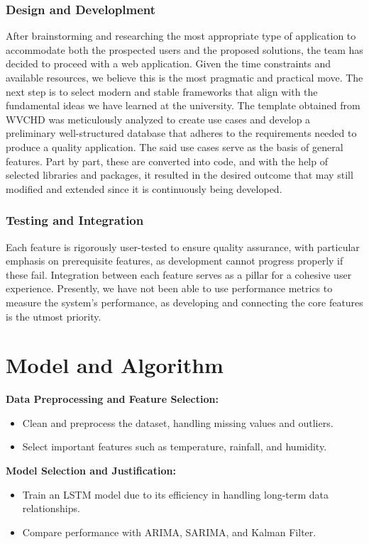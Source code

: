 \subsubsection{Design and Developlment}
After brainstorming and researching the most appropriate type of application to accommodate both the prospected users and the proposed solutions, the team has decided to proceed with a web application. Given the time constraints and available resources, we believe this is the most pragmatic and practical move. The next step is to select modern and stable frameworks that align with the fundamental ideas we have learned at the university. The template obtained from WVCHD was meticulously analyzed to create use cases and develop a preliminary well-structured database that adheres to the requirements needed to produce a quality application. The said use cases serve as the basis of general features. Part by part, these are converted into code, and with the help of selected libraries and packages, it resulted in the desired outcome that may still modified and extended since it is continuously being developed. 

\subsubsection{Testing and Integration}
Each feature is rigorously user-tested to ensure quality assurance, with particular emphasis on prerequisite features, as development cannot progress properly if these fail. Integration between each feature serves as a pillar for a cohesive user experience. Presently, we have not been able to use performance metrics to measure the system's performance, as developing and connecting the core features is the utmost priority. 

\section{Model and Algorithm}
\textbf{Data Preprocessing and Feature Selection:}
\begin{itemize}
	\item Clean and preprocess the dataset, handling missing values and outliers.
	\item Select important features such as temperature, rainfall, and humidity.
\end{itemize}

\textbf{Model Selection and Justification:}
\begin{itemize}
	\item Train an LSTM model due to its efficiency in handling long-term data relationships.
	\item Compare performance with ARIMA, SARIMA, and Kalman Filter.
\end{itemize}

